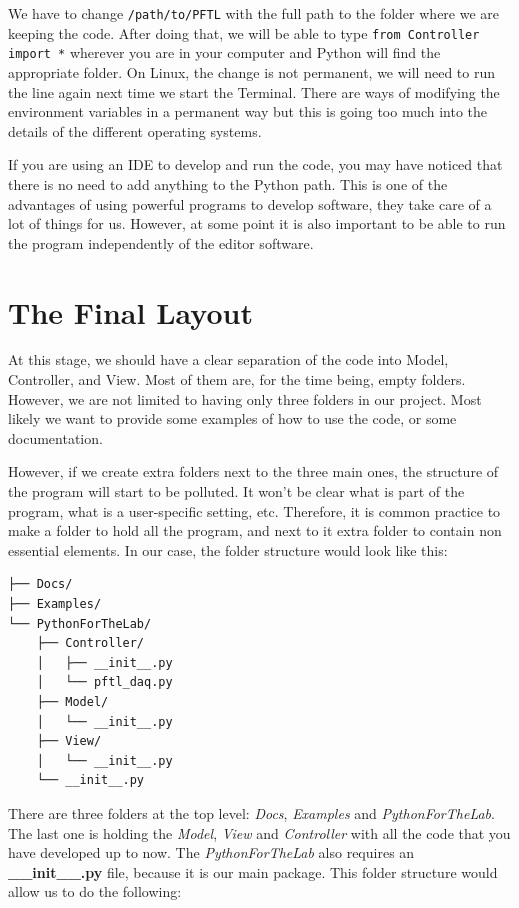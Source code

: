 We have to change \texttt{/path/to/PFTL} with the full path to the folder where we are keeping the code. After doing that, we will be able to type \texttt{from Controller import *} wherever you are in your computer and Python will find the appropriate folder. On Linux, the change is not permanent, we will need to run the line again next time we start the Terminal. There are ways of modifying the environment variables in a permanent way but this is going too much into the details of the different operating systems.

If you are using an IDE to develop and run the code, you may have noticed that there is no need to add anything to the Python path. This is one of the advantages of using powerful programs to develop software, they take care of a lot of things for us. However, at some point it is also important to be able to run the program independently of the editor software.

\section{The Final Layout}\label{section:final-layout}
At this stage, we should have a clear separation of the code into Model, Controller, and View. Most of them are, for the time being, empty folders. However, we are not limited to having only three folders in our project. Most likely we want to provide some examples of how to use the code, or some documentation.

However, if we create extra folders next to the three main ones, the structure of the program will start to be polluted. It won't be clear what is part of the program, what is a user-specific setting, etc. Therefore, it is common practice to make a folder to hold all the program, and next to it extra folder to contain non essential elements. In our case, the folder structure would look like this:

\begin{verbatim}
├── Docs/
├── Examples/
└── PythonForTheLab/
    ├── Controller/
    │   ├── __init__.py
    │   └── pftl_daq.py
    ├── Model/
    │   └── __init__.py
    ├── View/
    │   └── __init__.py
    └── __init__.py
\end{verbatim}

There are three folders at the top level: \emph{Docs}, \emph{Examples} and \emph{PythonForTheLab}. The last one is holding the \emph{Model}, \emph{View} and \emph{Controller} with all the code that you have developed up to now. The \emph{PythonForTheLab} also requires an \textbf{\_\_init\_\_.py} file, because it is our main package. This folder structure would allow us to do the following:


